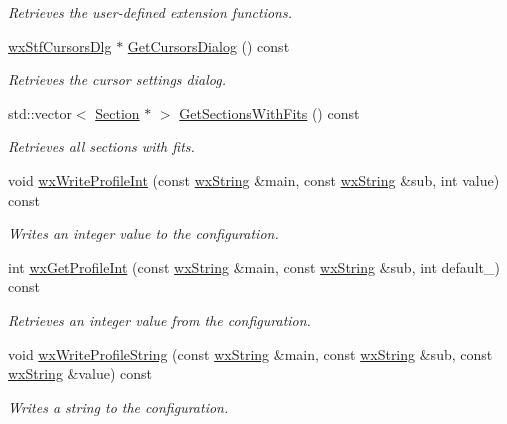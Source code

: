 \begin{DoxyCompactItemize}
\begin{DoxyCompactList}\small\item\em Retrieves the user-\/defined extension functions. \item\end{DoxyCompactList}\item 
\hyperlink{classwxStfCursorsDlg}{wxStfCursorsDlg} $\ast$ \hyperlink{classwxStfApp_ac953818454f409adebdc2a195225c292}{GetCursorsDialog} () const 
\begin{DoxyCompactList}\small\item\em Retrieves the cursor settings dialog. \item\end{DoxyCompactList}\item 
std::vector$<$ \hyperlink{classSection}{Section} $\ast$ $>$ \hyperlink{classwxStfApp_a2b27b151af8a1062542f35c466281b55}{GetSectionsWithFits} () const 
\begin{DoxyCompactList}\small\item\em Retrieves all sections with fits. \item\end{DoxyCompactList}\item 
void \hyperlink{classwxStfApp_a487f19baf697d6e51db9c3a4f27cacf6}{wxWriteProfileInt} (const \hyperlink{classwxString}{wxString} \&main, const \hyperlink{classwxString}{wxString} \&sub, int value) const 
\begin{DoxyCompactList}\small\item\em Writes an integer value to the configuration. \item\end{DoxyCompactList}\item 
int \hyperlink{classwxStfApp_a2fa40721aba5a795665a99711701b3b0}{wxGetProfileInt} (const \hyperlink{classwxString}{wxString} \&main, const \hyperlink{classwxString}{wxString} \&sub, int default\_\-) const 
\begin{DoxyCompactList}\small\item\em Retrieves an integer value from the configuration. \item\end{DoxyCompactList}\item 
void \hyperlink{classwxStfApp_a731ce695f19f790f9e5b49252c3cddeb}{wxWriteProfileString} (const \hyperlink{classwxString}{wxString} \&main, const \hyperlink{classwxString}{wxString} \&sub, const \hyperlink{classwxString}{wxString} \&value) const 
\begin{DoxyCompactList}\small\item\em Writes a string to the configuration. \item\end{DoxyCompactList}\item 

\end{DoxyCompactItemize}
